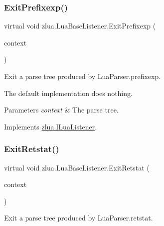 \subsubsection{\texorpdfstring{Exit\+Prefixexp()}{ExitPrefixexp()}}
{\footnotesize\ttfamily virtual void zlua.\+Lua\+Base\+Listener.\+Exit\+Prefixexp (\begin{DoxyParamCaption}\item[{\mbox{[}\+Not\+Null\mbox{]} \mbox{\hyperlink{classzlua_1_1_lua_parser_1_1_prefixexp_context}{Lua\+Parser.\+Prefixexp\+Context}}}]{context }\end{DoxyParamCaption})\hspace{0.3cm}{\ttfamily [virtual]}}



Exit a parse tree produced by Lua\+Parser.\+prefixexp. 

The default implementation does nothing.


\begin{DoxyParams}{Parameters}
{\em context} & The parse tree.\\
\hline
\end{DoxyParams}


Implements \mbox{\hyperlink{interfacezlua_1_1_i_lua_listener_a844508765196c91884c10bcaa1a14424}{zlua.\+I\+Lua\+Listener}}.

\mbox{\label{classzlua_1_1_lua_base_listener_a8b590e84f7634f57b233bc7df33591e6}} 
\subsubsection{\texorpdfstring{Exit\+Retstat()}{ExitRetstat()}}
{\footnotesize\ttfamily virtual void zlua.\+Lua\+Base\+Listener.\+Exit\+Retstat (\begin{DoxyParamCaption}\item[{\mbox{[}\+Not\+Null\mbox{]} \mbox{\hyperlink{classzlua_1_1_lua_parser_1_1_retstat_context}{Lua\+Parser.\+Retstat\+Context}}}]{context }\end{DoxyParamCaption})\hspace{0.3cm}{\ttfamily [virtual]}}



Exit a parse tree produced by Lua\+Parser.\+retstat. 

